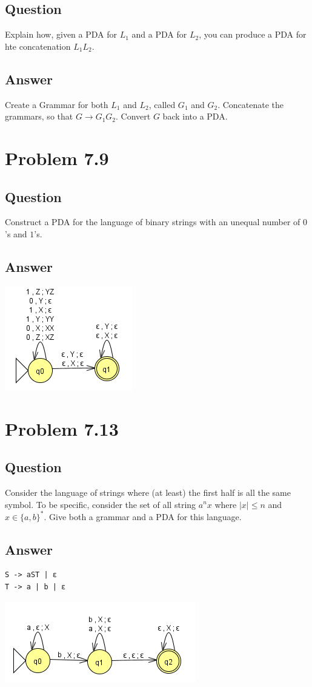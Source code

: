 \documentclass[12pt, a4paper]{article}
\begin{document}
\subsection{Question}
Explain how, given a PDA for $L_{1}$ and a PDA for $L_{2}$, you can produce a PDA for hte concatenation $L_{1}L_{2}$.
\subsection{Answer}
Create a Grammar for both $L_{1}$ and $L_{2}$, called $G_{1}$ and $G_{2}$. Concatenate the grammars, so that $G \to G_{1}G_{2}$. Convert $G$ back into a PDA.

\section{Problem 7.9}
\subsection{Question}
Construct a PDA for the language of binary strings with an unequal number of $0$'s and $1$'s.
\subsection{Answer}
\begin{center}
\includegraphics[scale=1]{7.9}
\end{center}

\section{Problem 7.13}
\subsection{Question}
Consider the language of strings where (at least) the first half is all the same symbol. To be specific, consider the set of all string $a^{n}x$ where $|x| \leq n$ and $x \in \{a,b\}^{*}$. Give both a grammar and a PDA for this language.
\subsection{Answer}
\begin{lstlisting}
S -> aST | ε
T -> a | b | ε
\end{lstlisting}
\begin{center}
\includegraphics[scale=1]{7.13}
\end{center}
\end{document}
